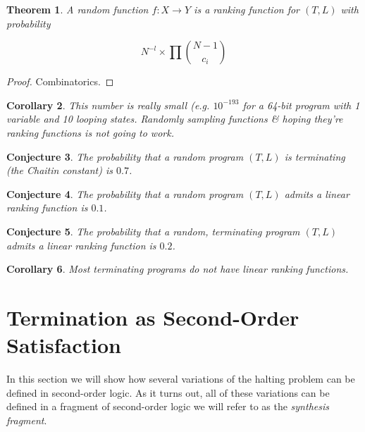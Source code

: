\documentclass[preprint]{sigplanconf}
\newtheorem{theorem}{Theorem}
\newtheorem{corollary}[theorem]{Corollary}
\newtheorem{conjecture}[theorem]{Conjecture}
\theoremstyle{definition}
\begin{document}
\begin{theorem}
 A random function $f : X \to Y$ is a ranking function for $(T, L)$ with probability

 $$N^{-l} \times \prod {{N-1} \choose c_i}$$
\end{theorem}

\begin{proof}
 Combinatorics.
\end{proof}


\begin{corollary}
 This number is really small (e.g. $10^{-193}$ for a 64-bit program with 1 variable and 10 looping states.
 Randomly sampling functions \& hoping they're ranking functions is not going to work.
\end{corollary}


\begin{conjecture}
 The probability that a random program $(T, L)$ is terminating (the Chaitin constant)
 is $0.7$.
\end{conjecture}

\begin{conjecture}
 The probability that a random program $(T, L)$ admits a linear ranking function is
 $0.1$.
\end{conjecture}

\begin{conjecture}
 The probability that a random, terminating program $(T, L)$ admits a linear ranking function
 is $0.2$.
\end{conjecture}


\begin{corollary}
 Most terminating programs do not have linear ranking functions.
\end{corollary}


\section{Termination as Second-Order Satisfaction}
In this section we will show how several variations of the halting problem can be defined in second-order
logic.  As it turns out, all of these variations can be defined in a fragment of second-order logic
we will refer to as the \emph{synthesis fragment}.
\end{document}
